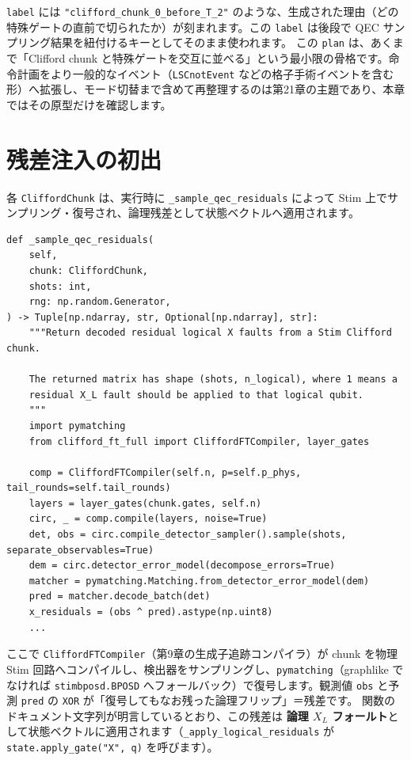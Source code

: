 \texttt{label} には \texttt{"clifford\_chunk\_0\_before\_T\_2"} のような、生成された理由（どの特殊ゲートの直前で切られたか）が刻まれます。この \texttt{label} は後段で QEC サンプリング結果を紐付けるキーとしてそのまま使われます。
この \texttt{plan} は、あくまで「Clifford chunk と特殊ゲートを交互に並べる」という最小限の骨格です。命令計画をより一般的なイベント（\texttt{LSCnotEvent} などの格子手術イベントを含む形）へ拡張し、モード切替まで含めて再整理するのは第21章の主題であり、本章ではその原型だけを確認します。

\section{残差注入の初出}\label{sec:residual_intro}

各 \texttt{CliffordChunk} は、実行時に \texttt{\_sample\_qec\_residuals} によって Stim 上でサンプリング・復号され、論理残差として状態ベクトルへ適用されます。

\begin{lstlisting}[caption={src/stages/01\_mpp/src/ftqc/hybrid\_ftqc\_runtime.py の \_sample\_qec\_residuals（抜粋・行625--667）}]
def _sample_qec_residuals(
    self,
    chunk: CliffordChunk,
    shots: int,
    rng: np.random.Generator,
) -> Tuple[np.ndarray, str, Optional[np.ndarray], str]:
    """Return decoded residual logical X faults from a Stim Clifford chunk.

    The returned matrix has shape (shots, n_logical), where 1 means a
    residual X_L fault should be applied to that logical qubit.
    """
    import pymatching
    from clifford_ft_full import CliffordFTCompiler, layer_gates

    comp = CliffordFTCompiler(self.n, p=self.p_phys, tail_rounds=self.tail_rounds)
    layers = layer_gates(chunk.gates, self.n)
    circ, _ = comp.compile(layers, noise=True)
    det, obs = circ.compile_detector_sampler().sample(shots, separate_observables=True)
    dem = circ.detector_error_model(decompose_errors=True)
    matcher = pymatching.Matching.from_detector_error_model(dem)
    pred = matcher.decode_batch(det)
    x_residuals = (obs ^ pred).astype(np.uint8)
    ...
\end{lstlisting}

ここで \texttt{CliffordFTCompiler}（第9章の生成子追跡コンパイラ）が chunk を物理 Stim 回路へコンパイルし、検出器をサンプリングし、\texttt{pymatching}（graphlike でなければ \texttt{stimbposd.BPOSD} へフォールバック）で復号します。観測値 \texttt{obs} と予測 \texttt{pred} の \texttt{XOR} が「復号してもなお残った論理フリップ」＝残差です。
関数のドキュメント文字列が明言しているとおり、この残差は \textbf{論理 $X_L$ フォールト}として状態ベクトルに適用されます（\texttt{\_apply\_logical\_residuals} が \texttt{state.apply\_gate("X", q)} を呼びます）。

